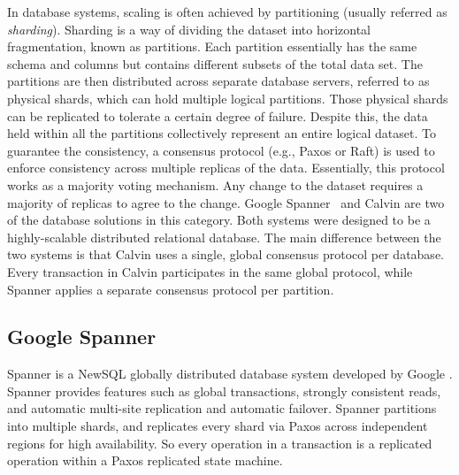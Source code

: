 In database systems, scaling is often achieved by partitioning (usually referred
as \emph{sharding}). Sharding is a way of dividing the dataset into horizontal
fragmentation, known as partitions. Each partition essentially has the same
schema and columns but contains different subsets of the total data set. The
partitions are then distributed across separate database servers, referred to as
physical shards, which can hold multiple logical partitions. Those physical
shards can be replicated to tolerate a certain degree of failure. Despite
this, the data held within all the partitions collectively represent an entire
logical dataset. To guarantee the consistency, a consensus protocol (e.g., Paxos
or Raft) is used to enforce consistency across multiple replicas of the data.
Essentially, this protocol works as a majority voting mechanism. Any change to
the dataset requires a majority of replicas to agree to the change. Google
Spanner~\cite{corbett2013spanner} and Calvin \cite{calvin} are two of the
database solutions in this category. Both systems were designed to be a
highly-scalable distributed relational database. The main difference between the
two systems is that Calvin uses a single, global consensus protocol per
database. Every transaction in Calvin participates in the same global protocol,
while Spanner applies a separate consensus protocol per partition.


\subsection{Google Spanner}

Spanner is a NewSQL \cite{Grolinger:2013tp} globally distributed database system
developed by Google \cite{corbett2013spanner}. Spanner provides features such as
global transactions, strongly consistent reads, and automatic multi-site
replication and automatic failover. Spanner partitions into multiple shards, and
replicates every shard via Paxos across independent regions for high
availability. So every operation in a transaction is a replicated operation
within a Paxos replicated state machine.

